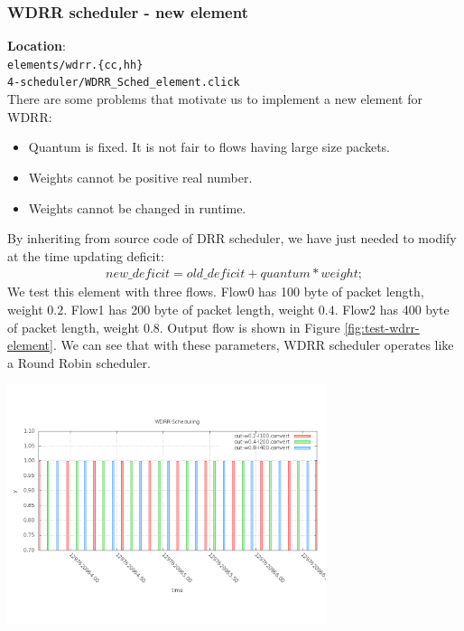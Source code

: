 \documentclass[a4paper]{article}
\begin{document}
  \subsubsection{WDRR scheduler - new element}
  \textbf{Location}: \\
  \texttt{elements/wdrr.\{cc,hh\}} \\ 
  \texttt{4-scheduler/WDRR\_Sched\_element.click}\\
  There are some problems that motivate us to implement a new element for WDRR:
  \begin{itemize}
  	\item Quantum is fixed. It is not fair to flows having large size packets.
  	\item Weights cannot be positive real number.
  	\item Weights cannot be changed in runtime.
  \end{itemize}
  By inheriting from source code of DRR scheduler, we have just needed to modify at the time updating deficit: 
  \begin{align*}
    new\_deficit = old\_deficit + quantum * weight;
  \end{align*}
  We test this element with three flows. Flow0 has 100 byte of packet length, weight $0.2$. Flow1 has 200 byte of packet length, weight $0.4$. Flow2 has 400 byte of packet length, weight $0.8$. Output flow is shown in Figure \ref{fig:test-wdrr-element}. We can see that with these parameters, WDRR scheduler operates like a Round Robin scheduler.
  \begin{center}
	\includegraphics[width=0.70\textwidth]{wdrr-dense-element.png}
	\label{fig:test-wdrr-element}
  \end{center}
  
\end{document}
